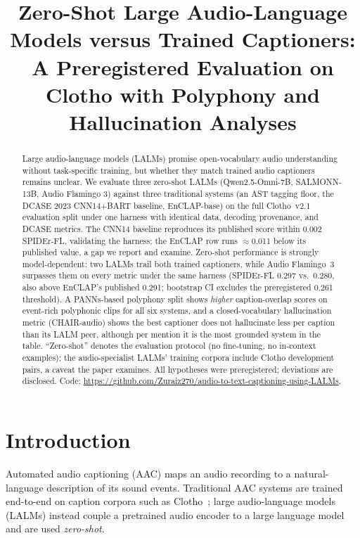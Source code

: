 \documentclass[conference]{IEEEtran}
\begin{document}
\title{Zero-Shot Large Audio-Language Models versus Trained Captioners:\\
A Preregistered Evaluation on Clotho with Polyphony and Hallucination Analyses}

\author{
}

\maketitle

\begin{abstract}
Large audio-language models (LALMs) promise open-vocabulary audio understanding
without task-specific training, but whether they match trained audio captioners
remains unclear. We evaluate three zero-shot LALMs (Qwen2.5-Omni-7B, SALMONN-13B,
Audio Flamingo 3) against three traditional systems (an AST tagging floor, the
DCASE 2023 CNN14+BART baseline, EnCLAP-base) on the full Clotho~v2.1 evaluation
split under one harness with identical data, decoding provenance, and DCASE
metrics. The CNN14 baseline reproduces its published score within 0.002
SPIDEr-FL, validating the harness; the EnCLAP row runs $\approx$0.011 below
its published value, a gap we report and examine. Zero-shot performance is strongly
model-dependent: two LALMs trail both trained captioners, while Audio Flamingo~3
surpasses them on every metric under the same harness (SPIDEr-FL 0.297 vs.\ 0.280, also
above EnCLAP's published 0.291; bootstrap CI excludes the preregistered 0.261
threshold). A PANNs-based polyphony split shows
\emph{higher} caption-overlap scores on event-rich polyphonic clips for all six
systems, and a closed-vocabulary hallucination metric (CHAIR-audio) shows the
best captioner does not hallucinate less per caption than its LALM peer,
although per mention it is the most grounded system in the table. ``Zero-shot''
denotes the evaluation protocol (no fine-tuning, no in-context examples); the
audio-specialist LALMs' training corpora include Clotho development pairs, a
caveat the paper examines. All hypotheses were
preregistered; deviations are disclosed.
Code: \url{https://github.com/Zuraiz270/audio-to-text-captioning-using-LALMs}.
\end{abstract}

\section{Introduction}\label{sec:intro}
Automated audio captioning (AAC) maps an audio recording to a natural-language
description of its sound events. Traditional AAC systems are trained end-to-end
on caption corpora such as Clotho~\cite{drossos2020clotho}; large audio-language
models (LALMs) instead couple a pretrained audio encoder to a large language
model and are used \emph{zero-shot}.
\end{document}
